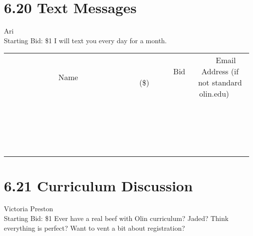 \documentclass[11pt]{article}
\begin{document}
\section*{6.20 Text Messages}
Ari
\\
Starting Bid: \$1
\newline
I will text you every day for a month.
\\[3ex]
\begin{tabular}{c c c}
~~~~~~~~~~~~~Name~~~~~~~~~~~~~ & ~~~~~~~~~Bid (\$)~~~~~~~~~  & ~~~Email Address (if not standard olin.edu)~~~\\
 & & \\
\hline
 & & \\
\hline
 & & \\
\hline
 & & \\
\hline
 & & \\
\hline
 & & \\
\hline
 & & \\
\hline
 & & \\
\hline
 & & \\
\hline
 & & \\
\hline
 & & \\
\hline
 & & \\
\hline
 & & \\
\hline
 & & \\
\hline
 & & \\
\hline
 & & \\
\hline
 & & \\
\hline
 & & \\
\hline
 & & \\
\hline
\end{tabular}
\newpage
\section*{6.21 Curriculum Discussion}
Victoria Preston
\\
Starting Bid: \$1
\newline
Ever have a real beef with Olin curriculum?  Jaded?  Think everything is perfect?  Want to vent a bit about registration?  
\end{document}
